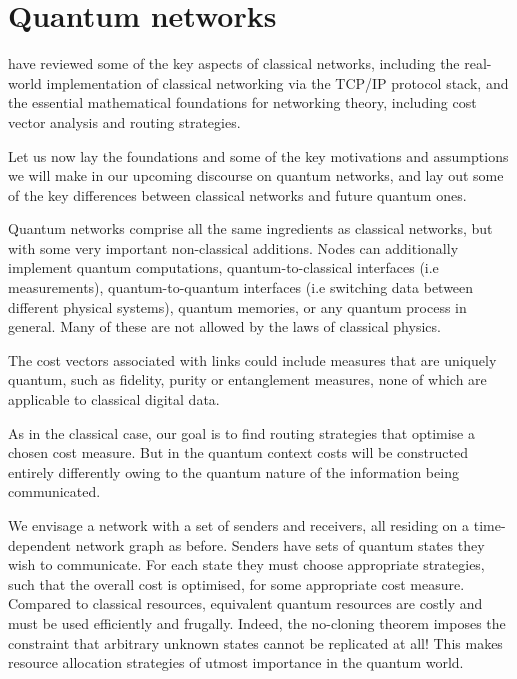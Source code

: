 %
%

\section{Quantum networks} \label{sec:quant_net} 

 have reviewed some of the key aspects of classical networks, including the real-world implementation of classical networking via the TCP/IP protocol stack, and the essential mathematical foundations for networking theory, including cost vector analysis and routing strategies.

Let us now lay the foundations and some of the key motivations and assumptions we will make in our upcoming discourse on quantum networks, and lay out some of the key differences between classical networks and future quantum ones.

Quantum networks comprise all the same ingredients as classical networks, but with some very important non-classical additions. Nodes can additionally implement quantum computations, quantum-to-classical interfaces (i.e measurements), quantum-to-quantum interfaces (i.e switching data between different physical systems), quantum memories, or any quantum process in general. Many of these are not allowed by the laws of classical physics.

The cost vectors associated with links could include measures that are uniquely quantum, such as fidelity, purity or entanglement measures, none of which are applicable to classical digital data.

As in the classical case, our goal is to find routing strategies that optimise a chosen cost measure. But in the quantum context costs will be constructed entirely differently owing to the quantum nature of the information being communicated.

We envisage a network with a set of senders and receivers, all residing on a time-dependent network graph as before. Senders have sets of quantum states they wish to communicate. For each state they must choose appropriate strategies, such that the overall cost is optimised, for some appropriate cost measure. Compared to classical resources, equivalent quantum resources are costly and must be used efficiently and frugally. Indeed, the no-cloning theorem imposes the constraint that arbitrary unknown states cannot be replicated at all! This makes resource allocation strategies of utmost importance in the quantum world.

